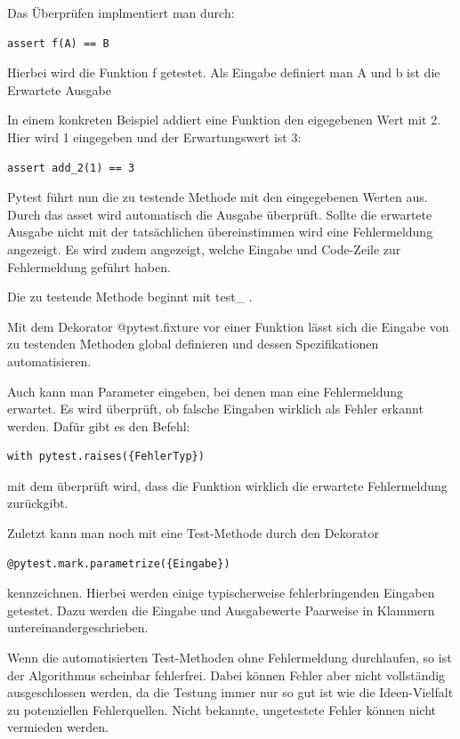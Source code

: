 \documentclass[]{dsadokumentation}
\begin{document}
Das Überprüfen implmentiert man durch:

\begin{verbatim}
assert f(A) == B
\end{verbatim}

Hierbei wird die Funktion f getestet. Als Eingabe definiert man A und b ist die Erwartete Ausgabe

In einem konkreten Beispiel addiert eine Funktion den eigegebenen Wert mit 2. Hier wird 1 eingegeben und der Erwartungswert ist 3:

\begin{verbatim}
assert add_2(1) == 3
\end{verbatim}

Pytest führt nun die zu testende Methode mit den eingegebenen Werten aus. Durch das asset wird automatisch die Ausgabe überprüft. Sollte die erwartete Ausgabe nicht mit der tatsächlichen übereinstimmen wird eine Fehlermeldung angezeigt. Es wird zudem angezeigt, welche Eingabe und Code-Zeile zur Fehlermeldung geführt haben.

Die zu testende Methode beginnt mit test\_ .

Mit dem Dekorator @pytest.fixture vor einer Funktion lässt sich die Eingabe von zu testenden Methoden global definieren und dessen Spezifikationen automatisieren.

Auch kann man Parameter eingeben, bei denen man eine Fehlermeldung erwartet. Es wird überprüft, ob falsche Eingaben wirklich als Fehler erkannt werden. Dafür gibt es den Befehl:

\begin{verbatim}
with pytest.raises({FehlerTyp})
\end{verbatim}

mit dem überprüft wird, dass die Funktion wirklich die erwartete Fehlermeldung zurückgibt.

Zuletzt kann man noch mit eine Test-Methode durch den Dekorator

\begin{verbatim}
@pytest.mark.parametrize({Eingabe})
\end{verbatim}

kennzeichnen. Hierbei werden einige typischerweise fehlerbringenden Eingaben getestet. Dazu werden die Eingabe und Ausgabewerte Paarweise in Klammern untereinandergeschrieben.

Wenn die automatisierten Test-Methoden ohne Fehlermeldung durchlaufen, so ist der Algorithmus scheinbar fehlerfrei. Dabei können Fehler aber nicht vollständig ausgeschlossen werden, da die Testung immer nur so gut ist wie die Ideen-Vielfalt zu potenziellen Fehlerquellen. Nicht bekannte, ungetestete Fehler können nicht vermieden werden.
\end{document}
